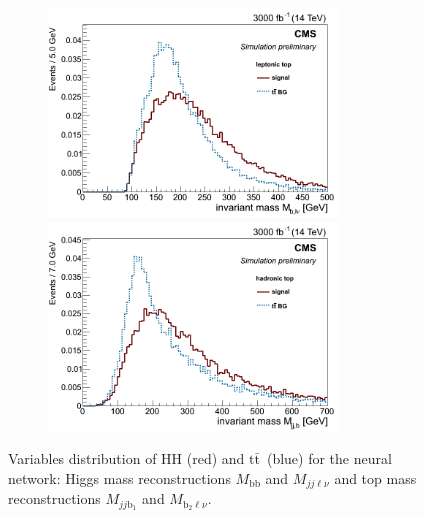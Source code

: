 \documentclass[10pt,a4paper]{article}
\newcommand{\ww}{7.7cm} %
\newcommand{\dd}{-2mm} %
\renewcommand{\tt}{$\text{t}\bar{\text{t}}$}
\newcommand{\lnu}{$\ell\nu$}
\newcommand{\bb}{\text{bb}}
\begin{document}
\begin{figure}[h]
  \begin{subfigure}[b]{17cm}
    \begin{minipage}[h!]{\ww}
      \centering
      \includegraphics[width=\ww]{figs/M_blnu.png}
    \end{minipage}
    \begin{minipage}[h!]{\ww}
      \centering
      \includegraphics[width=\ww]{figs/M_jjb.png}
    \end{minipage}
    \hspace{9mm}
  \end{subfigure}	
  \vspace{\dd}
  \caption{Variables distribution of HH (red) and \tt\ (blue) for the neural network: Higgs mass reconstructions $M_{\bb}$ and $M_{jj\ell\nu}$ and top mass reconstructions $M_{jj\text{b}_1}$ and $M_{\text{b}_2\text{\lnu}}$.} \label{vars3}

\end{figure}
\end{document}
